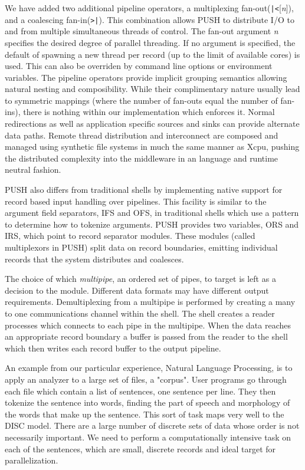 \documentclass{sig-alt-release2}
\begin{document}
We have added two additional pipeline operators, 
a multiplexing fan-out(\verb!|<![\emph{n}]), and a coalescing fan-in(\verb!>|!). 
This combination allows PUSH to distribute I/O to and from multiple
simultaneous threads of control.
The fan-out argument \emph{n} specifies the desired degree of parallel 
threading.  If no argument is specified, the default of spawning a new
thread per record (up to the limit of available cores) is used.  This can
also be overriden by command line options or environment variables.
The pipeline operators provide implicit grouping semantics allowing natural 
nesting and composibility.
While their complimentary nature usually lead to symmetric
mappings (where the number of fan-outs equal the number of fan-ins), there is 
nothing within our implementation which enforces it.
Normal redirections as well as application specific sources and sinks 
can provide alternate data paths.
Remote thread distribution and interconnect are composed and managed
using synthetic file systems in much the same manner as Xcpu,\cite{xcpu}
pushing the distributed complexity into the middleware in an language and 
runtime neutral fashion.

PUSH also differs from traditional shells by implementing native support for 
record based input handling over pipelines. This facility is similar to the 
argument field separators, IFS and OFS, in traditional shells which use a 
pattern to determine how to tokenize arguments. PUSH provides two variables,  
ORS and IRS, which point to record separator modules. These modules 
(called multiplexors in PUSH) split data on record boundaries, emitting 
individual records that the system distributes and coalesces. 

The choice of which \emph{multipipe}, an ordered set of pipes, to target is left as a decision to the module. 
Different data formats may have different output requirements. 
Demultiplexing from a multipipe is performed by creating a many to one 
communications channel within the shell. The shell creates a reader processes 
which connects to each pipe in the multipipe. When the data reaches an 
appropriate record boundary a buffer is passed from the reader to the shell 
which then writes each record buffer to the output pipeline. 

An example from our particular experience, Natural Language Processing, is 
to apply an analyzer to a large set of files, a "corpus". User programs go 
through each file which contain a list of sentences, one sentence per line. 
They then tokenize the sentence into words, finding the part of speech and 
morphology of the words that make up the sentence.
This sort of task maps very well to the DISC model. There are a large number of 
discrete sets of data whose order is not necessarily important. We need to 
perform a computationally intensive task on each of the sentences, which are 
small, discrete records and ideal target for parallelization. 
\end{document}
